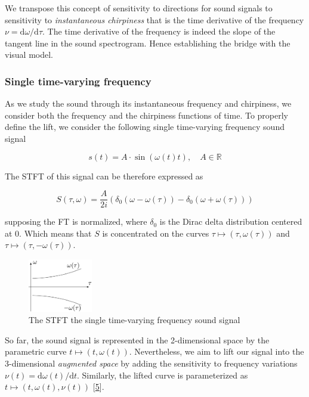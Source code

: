 \documentclass[american,]{article}
\theoremstyle{definition}
\theoremstyle{definition}
\theoremstyle{definition}
\theoremstyle{remark}
\begin{document}
We transpose this concept of sensitivity to directions
for sound signals to sensitivity to \emph{instantaneous chirpiness}
that is the time derivative of the frequency \(\nu=\mathrm{d}\omega/\mathrm{d}\tau\).
The time derivative of the frequency is indeed the slope
of the tangent line in the sound spectrogram.
Hence establishing the bridge with the visual model.

\hypertarget{single-time-varying-frequency}{%
\subsubsection{Single time-varying frequency}\label{single-time-varying-frequency}}

As we study the sound through its instantaneous frequency and chirpiness,
we consider both the frequency and the chirpiness functions of time.
To properly define the lift, we consider the following single
time-varying frequency sound signal

\begin{equation}
s(t) = A\cdot\sin(\omega(t)t),\quad A\in\mathbb{R}
\end{equation}

The STFT of this signal can be therefore expressed as

\begin{equation}
S(\tau,\omega) = \frac{A}{2i}\left(\delta_0(\omega-\omega(\tau)) - \delta_0(\omega+\omega(\tau))\right)
\end{equation}

supposing the FT is normalized, where \(\delta_0\) is the Dirac delta
distribution centered at 0.
Which means that \(S\) is concentrated on the curves \(\tau\mapsto(\tau,\omega(\tau))\)
and \(\tau\mapsto(\tau,-\omega(\tau))\).

\begin{figure}
\centering
\includegraphics[width=0.25\textwidth,height=\textheight]{img/single_freq.png}
\caption{The STFT the single time-varying frequency sound signal}
\end{figure}

So far, the sound signal is represented in the 2-dimensional space
by the parametric curve \(t\mapsto(t,\omega(t))\).
Nevertheless, we aim to lift our signal into the 3-dimensional \emph{augmented space}
by adding the sensitivity to frequency variations \(\nu(t)=\mathrm{d}\omega(t)/\mathrm{d}t\).
Similarly, the lifted curve is parameterized as \(t\mapsto(t,\omega(t),\nu(t))\) {[}\protect\hyperlink{ref-boscain2021}{5}{]}.
\end{document}
